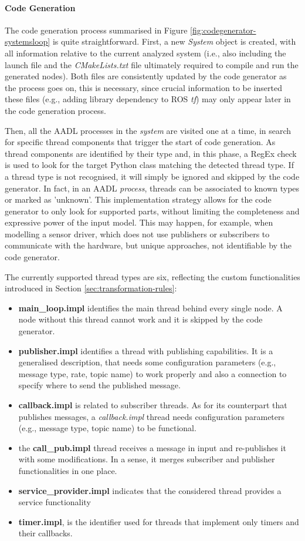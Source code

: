 \paragraph{Code Generation} The code generation process summarised in Figure \ref{fig:codegenerator-systemsloop} is quite straightforward. First, a new \textit{System} object is created, with all information relative to the current analyzed system (i.e., also including the launch file and the \textit{CMakeLists.txt} file ultimately required to compile and run the generated nodes). Both files are consistently updated by the code generator as the process goes on, this is necessary, since crucial information to be inserted these files (e.g., adding library dependency to ROS \textit{tf}) may only appear later in the code generation process.

Then, all the AADL processes in the \textit{system} are visited one at a time, in search for specific thread components that trigger the start of code generation. As thread components are identified by their type and, in this phase, a RegEx check is used to look for the target Python class matching the detected thread type. If a thread type is not recognised, it will simply be ignored and skipped by the code generator. In fact, in an AADL \textit{process}, threads can be associated to known types or marked as 'unknown'. This implementation strategy allows for the code generator to only look for supported parts, without limiting the completeness and expressive power of the input model. This may happen, for example, when modelling a sensor driver, which does not use publishers or subscribers to communicate with the hardware, but unique approaches, not identifiable by the code generator.

The currently supported thread types are six, reflecting the custom functionalities introduced in Section \ref{sec:transformation-rules}:
\begin{itemize}
\item{ \textbf{main\_loop.impl} identifies the main thread behind every single node. A node without this thread cannot work and it is skipped by the code generator.}
\item {\textbf{publisher.impl} identifies a thread with publishing capabilities. It is a generalised description, that needs some configuration parameters (e.g., message type, rate, topic name) to work properly and also a connection to specify where to send the published message.}
\item \textbf{callback.impl} is related to subscriber threads. As for its counterpart that publishes messages, a \textit{callback.impl} thread needs configuration parameters (e.g., message type, topic name) to be functional.
\item the \textbf{call\_pub.impl} thread receives a message in input and re-publishes it with some modifications. In a sense, it merges subscriber and publisher functionalities in one place.
\item \textbf{service\_provider.impl} indicates that the considered thread provides a service functionality
\item \textbf{timer.impl}, is the identifier used for threads that implement only timers and their callbacks.
\end{itemize}


